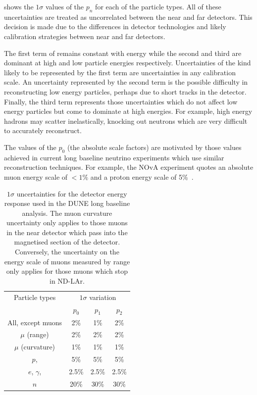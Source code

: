  shows the $1\sigma$ values of the $p_{n}$ for each of the particle types.
All of these uncertainties are treated as uncorrelated between the near and far detectors.
This decision is made due to the differences in detector technologies and likely calibration strategies between near and far detectors.

The first term of  remains constant with energy while the second and third are dominant at high and low particle energies respectively.
Uncertainties of the kind likely to be represented by the first term are uncertainties in any calibration scale.
An uncertainty represented by the second term is the possible difficulty in reconstructing low energy particles, perhaps due to short tracks in the detector.
Finally, the third term represents those uncertainties which do not affect low energy particles but come to dominate at high energies.
For example, high energy hadrons may scatter inelastically, knocking out neutrons which are very difficult to accurately reconstruct.

The values of the $p_{0}$ (the absolute scale factors) are motivated by those values achieved in current long baseline neutrino experiments which use similar reconstruction techniques.
For example, the NOvA experiment quotes an absolute muon energy scale of $<1\%$ and a proton energy scale of 5\%~\cite{nova2018}.

\begin{table}
	\caption[$1\sigma$ uncertainties for the detector energy response used in the DUNE long baseline analysis]{$1\sigma$ uncertainties for the detector energy response used in the DUNE long baseline analysis. The muon curvature uncertainty only applies to those muons in the near detector which pass into the magnetised section of the detector. Conversely, the uncertainty on the energy scale of muons measured by range only applies for those muons which stop in ND-LAr.}
	\label{tab:energyScaleParams}
	\centering
	\begin{tabular}{c c c c}
		\hline
		\hline
		Particle types & \multicolumn{3}{c}{$1\sigma$ variation} \\
		& $p_{0}$ & $p_{1}$ & $p_{2}$ \\
		\hline
		All, except muons      & 2\%   & 1\%   & 2\%   \\
		$\mu$ (range)          & 2\%   & 2\%   & 2\%   \\
		$\mu$ (curvature)      & 1\%   & 1\%   & 1\%   \\
		$p$, \pipm             & 5\%   & 5\%   & 5\%   \\
		$e$, $\gamma$, \pizero & 2.5\% & 2.5\% & 2.5\% \\
		$n$                    & 20\%  & 30\%  & 30\% \\
		\hline
	\end{tabular}
\end{table}

